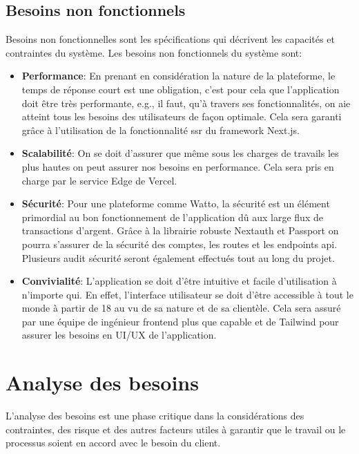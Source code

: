\documentclass[../main.tex]{subfiles}
\begin{document}
\subsection{Besoins non fonctionnels}
Besoins non fonctionnelles sont les spécifications qui décrivent les capacités et contraintes du système. \cite{functional_req}
\newline Les besoins non fonctionnels du système sont:
\begin{itemize}
  \item \textbf{Performance}: En prenant en considération la nature de la plateforme, le temps de réponse court est une obligation, c'est pour cela que l'application doit être très performante, e.g., il faut, qu'à travers ses fonctionnalités, on aie atteint tous les besoins des utilisateurs de façon optimale. Cela sera garanti grâce à l'utilisation de la fonctionnalité \acrfull{ssr} du framework Next.js.   
   \item \textbf{Scalabilité}: On se doit d'assurer que même sous les charges de travails les plus hautes on peut assurer nos besoins en performance. Cela sera pris en charge par le service Edge de Vercel.
   \item \textbf{Sécurité}: Pour une plateforme comme Watto, la sécurité est un élément primordial au bon fonctionnement de l'application dû aux large flux de transactions d'argent. Grâce à la librairie robuste Nextauth et Passport on pourra s'assurer de la sécurité des comptes, les routes et les endpoints api. Plusieurs audit sécurité seront également effectués tout au long du projet. 
  \item \textbf{Convivialité}: L'application se doit d'être intuitive et facile d'utilisation à n'importe qui. En effet, l'interface utilisateur se doit d'être accessible à tout le monde à partir de 18 au vu de sa nature et de sa clientèle. Cela sera assuré par une équipe de ingénieur frontend plus que capable et de Tailwind pour assurer les besoins en UI/UX de l'application. 
  \end{itemize}
  
\section{Analyse des besoins}
L'analyse des besoins est une phase critique dans la considérations des contraintes, des risque et des autres facteurs utiles à garantir que le travail ou le processus soient en accord avec le besoin du client. 
\end{document}
